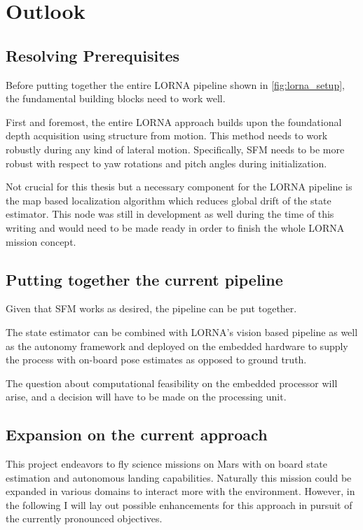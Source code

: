 \chapter{Outlook}
\label{sec:outlook}

\section{Resolving Prerequisites}

Before putting together the entire LORNA pipeline shown in \cref{fig:lorna_setup}, the fundamental building blocks need to work well. 

First and foremost, the entire LORNA approach builds upon the foundational depth acquisition using structure from motion. This method needs to work robustly during any kind of lateral motion. Specifically, SFM needs to be more robust with respect to yaw rotations and pitch angles during initialization.

Not crucial for this thesis but a necessary component for the LORNA pipeline is the map based localization algorithm which reduces global drift of the state estimator. This node was still in development as well during the time of this writing and would need to be made ready in order to finish the whole LORNA mission concept.

\section{Putting together the current pipeline}

Given that SFM works as desired, the pipeline can be put together. 

The state estimator can be combined with LORNA's vision based pipeline as well as the autonomy framework and deployed on the embedded hardware to supply the process with on-board pose estimates as opposed to ground truth. 

The question about computational feasibility on the embedded processor will arise, and a decision will have to be made on the processing unit.

\section{Expansion on the current approach}

This project endeavors to fly science missions on Mars with on board state estimation and autonomous landing capabilities. Naturally this mission could be expanded in various domains to interact more with the environment. However, in the following I will lay out possible enhancements for this approach in pursuit of the currently pronounced objectives.

